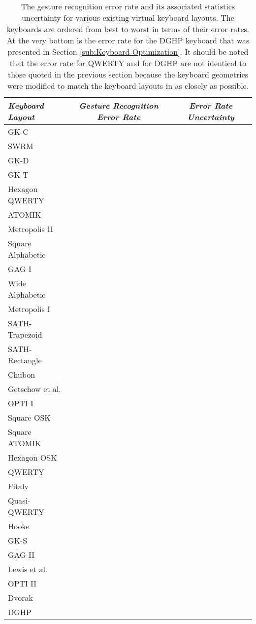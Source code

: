 \documentclass[final,1p,times,authoryear]{elsarticle}
\begin{document}
\begin{table}[!th]
\centering
\begin{tabular}{l*{2}{c}}
\textit{Keyboard Layout}	& \textit{Gesture Recognition Error Rate} & \textit{Error Rate Uncertainty} \\
\hline
GK-C				&  &  \\
SWRM				&  &  \\
GK-D				&  &  \\
GK-T					&  &  \\
Hexagon QWERTY		&  &  \\
ATOMIK				&  &  \\
Metropolis II			&  &  \\
Square Alphabetic		&  &  \\
GAG I				&  &  \\
Wide Alphabetic		&  &  \\
Metropolis I			&  &  \\
SATH-Trapezoid		&  &  \\
SATH-Rectangle		&  &  \\
Chubon				&  &  \\
Getschow et al.			&  &  \\
OPTI I				&  &  \\
Square OSK			&  &  \\
Square ATOMIK		&  &  \\
Hexagon OSK			&  &  \\
QWERTY				&  &  \\
Fitaly				&  &  \\
Quasi-QWERTY		&  &  \\
Hooke				&  &  \\
GK-S				&  &  \\
GAG II				&  &  \\
Lewis et al.			&  &  \\
OPTI II				&  &  \\
Dvorak				&  &  \\
\hline
DGHP				&  &  \\
\hline
\end{tabular}
\caption{The gesture recognition error rate and its associated statistics uncertainty for various
existing virtual keyboard layouts. The keyboards are ordered from best to worst in terms of their
error rates. At the very bottom is the error rate for the DGHP keyboard that was presented in Section \ref{sub:Keyboard-Optimization}.
It should be noted that the error rate for QWERTY and for DGHP are not identical to those quoted in the previous section because the keyboard geometries were modified to match the keyboard layouts in \cite{fastSwiping} as closely as possible.}
\label{table:keyboard_evaluations}
\end{table}
\end{document}
